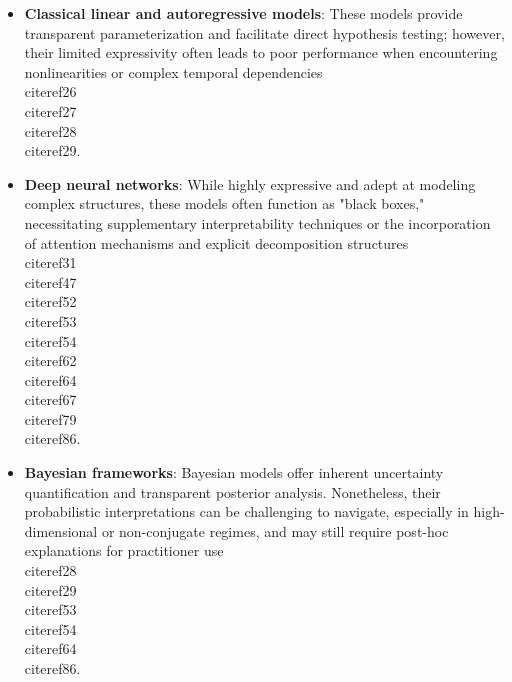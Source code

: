 \documentclass[11pt]{article}
\begin{document}
\begin{itemize}
    \item \textbf{Classical linear and autoregressive models}: These models provide transparent parameterization and facilitate direct hypothesis testing; however, their limited expressivity often leads to poor performance when encountering nonlinearities or complex temporal dependencies~\\cite{ref26}\\cite{ref27}\\cite{ref28}\\cite{ref29}.
    \item \textbf{Deep neural networks}: While highly expressive and adept at modeling complex structures, these models often function as "black boxes," necessitating supplementary interpretability techniques or the incorporation of attention mechanisms and explicit decomposition structures~\\cite{ref31}\\cite{ref47}\\cite{ref52}\\cite{ref53}\\cite{ref54}\\cite{ref62}\\cite{ref64}\\cite{ref67}\\cite{ref79}\\cite{ref86}.
    \item \textbf{Bayesian frameworks}: Bayesian models offer inherent uncertainty quantification and transparent posterior analysis. Nonetheless, their probabilistic interpretations can be challenging to navigate, especially in high-dimensional or non-conjugate regimes, and may still require post-hoc explanations for practitioner use~\\cite{ref28}\\cite{ref29}\\cite{ref53}\\cite{ref54}\\cite{ref64}\\cite{ref86}.
\end{itemize}
\end{document}
